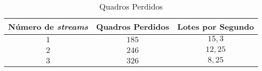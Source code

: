 
\begin{table}[H]
    \centering
    \caption{Quadros Perdidos}
    \label{tab:results:dropped_frames_table}
    \begin{tabular}{|c|c|c|}
    \toprule
    Número de \textit{streams} & Quadros Perdidos & Lotes por Segundo \\
    \midrule
    $1$ & $185$ & $15,3$ \\
    $2$ & $246$ & $12,25$ \\
    $3$ & $326$ & $8,25$ \\
    \bottomrule
    \end{tabular}
\end{table}